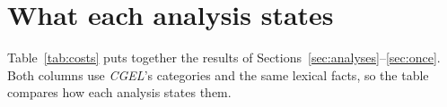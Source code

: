 %

\section{What each analysis states}\label{sec:costs}

Table~\ref{tab:costs} puts together the results of Sections~\ref{sec:analyses}--\ref{sec:once}. Both columns use \textit{CGEL}'s categories and the same lexical facts, so the table compares how each analysis states them.

